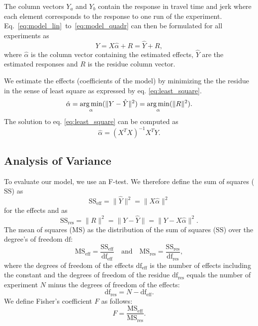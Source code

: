The column vectors $Y_a$ and $Y_b$ contain the response in travel time and jerk where each element corresponds to the response to one run of the experiment.
Eq.~\ref{eq:model_lin}~to~\ref{eq:model_quadr} can then be formulated for all experiments as
\begin{equation}
 Y = X \hat{\alpha} + R = \hat{Y} + R,
\end{equation}
where $\hat{\alpha}$ is the column vector containing the estimated effects, $\hat{Y}$ are the estimated responses and $R$ is the residue column vector.

We estimate the effects (coefficients of the model) by minimizing the the residue in the sense of least square as expressed by eq. \ref{eq:least_square}.
\begin{equation}\label{eq:least_square}
	\hat\alpha =  \operatorname*{arg\,min}_{\alpha}(\|Y - \hat{Y}\|^2) = \operatorname*{arg\,min}_{\alpha}(\|R\|^2).
\end{equation}
The solution to eq. \ref{eq:least_square} can be computed as
\begin{equation}
	\hat\alpha = (X^T X)^{-1} X^{T} Y.
\end{equation}



\subsection{Analysis of Variance}
To evaluate our model, we use an F-test. We therefore define the sum of squares ($\text{SS}$) as
\begin{equation}
	\text{SS}_\text{eff} = \| \hat{Y} \|^2 = \| X \hat{\alpha} \|^2
\end{equation}
for the effects and as
\begin{equation}
	\text{SS}_\text{res} = \| R \|^2 = \| Y - \hat{Y} \| = \| Y - X \hat{\alpha} \|^2.
\end{equation}
The mean of squares ($\text{MS}$) as the distribution of the sum of squares ($\text{SS}$) over the degree's of freedom $\text{df}$:
\begin{equation}
	\text{MS}_\text{eff} = \frac{\text{SS}_\text{eff}}{\text{df}_\text{eff}} \quad \text{and} \quad 
	\text{MS}_\text{res} = \frac{\text{SS}_\text{res}}{\text{df}_\text{res}},
\end{equation}
where the degrees of freedom of the effects $\text{df}_\text{eff}$ is the number of effects including the constant and the degrees of freedom of the residue $\text{df}_\text{res}$ equals the number of experiment $N$ minus the degrees of freedom of the effects:
\begin{equation}
\text{df}_\text{res} = N - \text{df}_\text{eff}.
\end{equation}
We define Fisher's coefficient $F$ as follows:
\begin{equation}
F = \frac{\text{MS}_\text{eff}}{\text{MS}_\text{res}}.
\end{equation}


